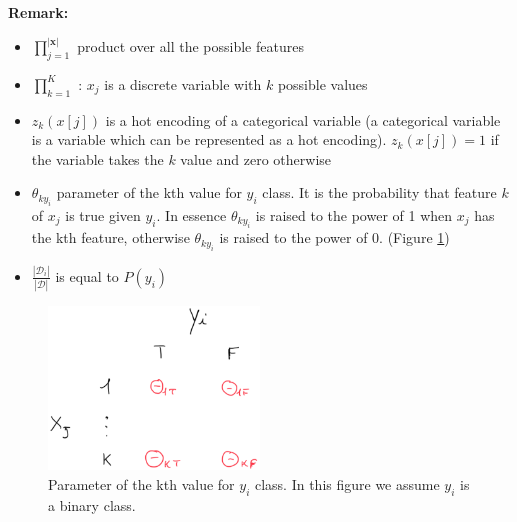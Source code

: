\textbf{Remark:}
\begin{itemize}
    \item $\prod_{j=1}^{|\pmb{x}|}$ product over all the possible features
    
    \item $\prod_{k=1}^{K}$ :  $x_j$ is a discrete variable with $k$ possible values
    
    \item $z_k(x[j])$ is a hot encoding of a categorical variable (a categorical variable is a variable which can be represented as a hot encoding). $z_k(x[j])=1$ if the variable takes the $k$ value and zero otherwise
    
    \item $\theta_{ky_i}$ parameter of the kth value for $y_i$ class. It is the probability that feature $k$ of $x_j$ is true given $y_i$. In essence $\theta_{ky_i}$ is raised to the power of 1 when $x_j$ has the kth feature, otherwise $\theta_{ky_i}$ is raised to the power of 0. (Figure \ref{fig:parameterOfTheKthValueForYiClass})
    
    \item $\frac{|\mathcal{D}_i|}{|\mathcal{D}|}$ is equal to $P(y_i)$
\end{itemize}

\begin{figure}
    \centering
    \includegraphics[width=0.5\textwidth]{images/parameterOfTheKthValueForYiClass.png}
    \caption{Parameter of the kth value for $y_i$ class. In this figure we assume $y_i$ is a binary class.}
    \label{fig:parameterOfTheKthValueForYiClass}
\end{figure}

